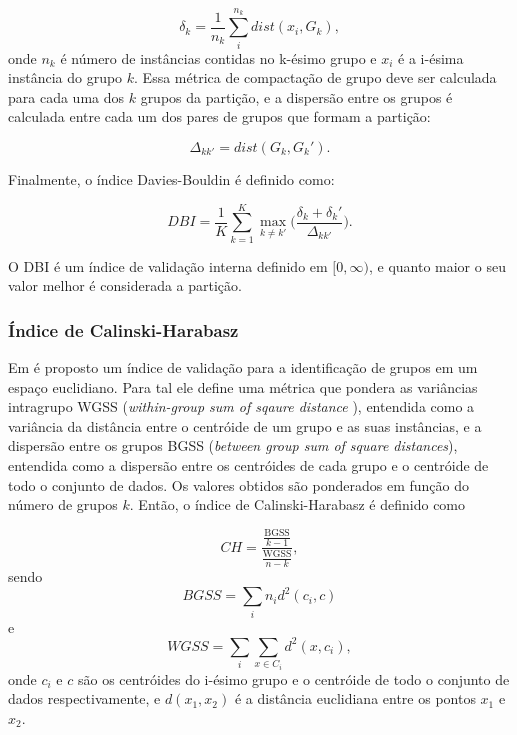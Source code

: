\begin{equation}
\delta_k = \frac{1}{n_k}\sum_{i}^{n_k} dist(x_i,G_k),
\end{equation}
onde $n_k$ é número de instâncias contidas no k-ésimo grupo e $x_i$ é a i-ésima instância do grupo $k$. Essa métrica de compactação de grupo deve ser calculada para cada uma dos $k$ grupos da partição, e a dispersão entre os grupos é calculada entre cada um dos pares de grupos que formam a partição:

\begin{equation}
\Delta_{kk'} = dist(G_k,G_k').
\end{equation}

Finalmente, o índice Davies-Bouldin é definido como:

\begin{equation}
DBI = \frac{1}{K}\sum_{k=1}^{K} \max_{k \neq k'} \bigg( \frac{\delta_k + \delta_k'}{\Delta_{kk'}}  \bigg).
\end{equation}

O DBI é um índice de validação interna definido em $[0,\infty)$, e quanto maior o seu valor melhor é considerada a partição.


\subsubsection{Índice de Calinski-Harabasz}

Em \parencite{CH} é proposto um índice de validação para a identificação de grupos em um espaço euclidiano. Para tal ele define uma métrica que pondera as variâncias intragrupo WGSS (\emph{within-group sum of sqaure distance }), entendida como a variância da distância entre o centróide de um grupo e as suas instâncias, e a dispersão entre os grupos BGSS (\emph{between group sum of square distances}), entendida como a dispersão entre os centróides de cada grupo e o centróide de todo o conjunto de dados. Os valores obtidos são ponderados em função do número de grupos $k$. Então, o índice de Calinski-Harabasz é definido como

\begin{equation} \label{eq:CH}
CH = \frac{\frac{\text{BGSS}}{k-1}}{\frac{\text{WGSS}}{n-k}},
\end{equation}
sendo
\begin{equation}
BGSS=\sum_i{n_i d^2(c_i,c)}
\end{equation}
e
\begin{equation}
WGSS=\sum_i\sum_{x \in C_i} d^2(x,c_i),
\end{equation}
onde $c_i$ e $c$ são os centróides do i-ésimo grupo e o centróide de todo o conjunto de dados respectivamente, e $d(x_1,x_2)$ é a distância euclidiana entre os pontos $x_1$ e $x_2$.

